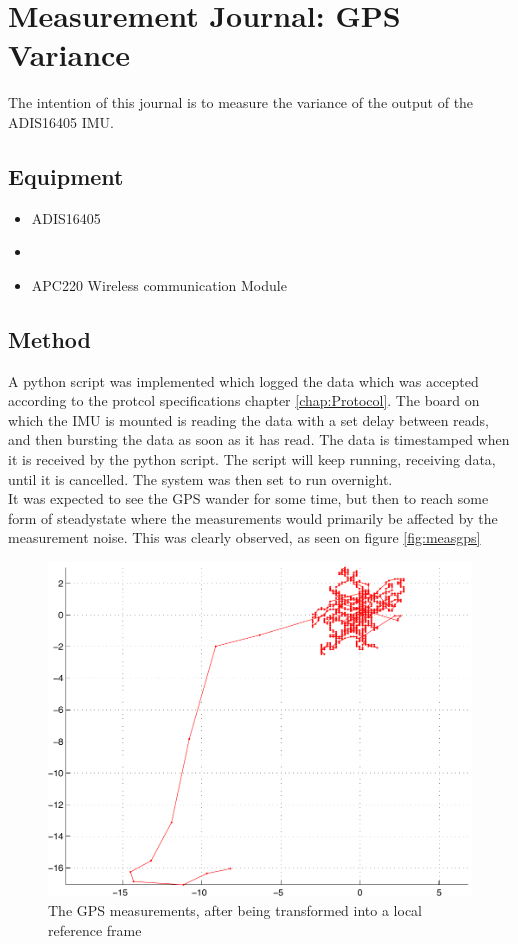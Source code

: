 \chapter{Measurement Journal: GPS Variance}
The intention of this journal is to measure the variance of the output of the ADIS16405 IMU.
\section{Equipment}
\begin{itemize}
\item ADIS16405
\item {}
\item APC220 Wireless communication Module
\end{itemize}

\section{Method}
A python script was implemented which logged the data which was accepted according to the protcol specifications chapter \ref{chap:Protocol}. The board on which the IMU is mounted is reading the data with a set delay between reads, and then bursting the data as soon as it has read. The data is timestamped when it is received by the python script. The script will keep running, receiving data, until it is cancelled. The system was then set to run overnight.\\
It was expected to see the GPS wander for some time, but then to reach some form of steadystate where the measurements would primarily be affected by the measurement noise. This was clearly observed, as seen on figure \ref{fig:measgps} \\
\begin{figure}
\includegraphics[width=\textwidth]{img/gpsmeas.pdf}
\caption{The GPS measurements, after being transformed into a local reference frame}
\end{figure}
\label{fig:measgps}

